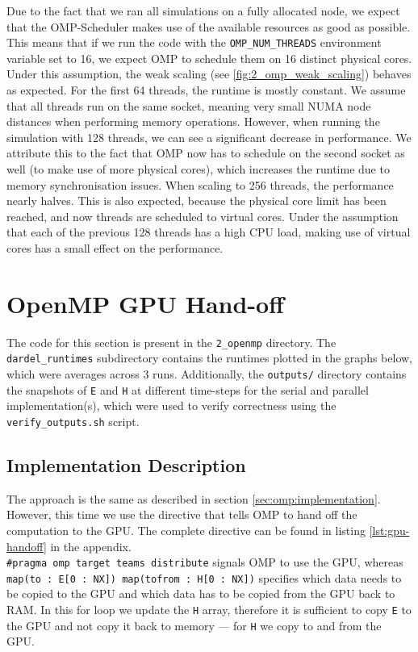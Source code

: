 \documentclass[a4paper,10pt]{article}
\begin{document}
\begin{multicols}{2}
Due to the fact that we ran all simulations on a fully allocated node, we expect that the OMP-Scheduler makes use of the available resources as good as possible.
This means that if we run the code with the \verb|OMP_NUM_THREADS| environment variable set to 16, we expect OMP to schedule them on 16 distinct physical cores.
Under this assumption, the weak scaling (see \ref{fig:2_omp_weak_scaling}) behaves as expected.
For the first 64 threads, the runtime is mostly constant.
We assume that all threads run on the same socket, meaning very small NUMA node distances when performing memory operations.
However, when running the simulation with 128 threads, we can see a significant decrease in performance.
We attribute this to the fact that OMP now has to schedule on the second socket as well (to make use of more physical cores), which increases the runtime due to memory synchronisation issues.
When scaling to 256 threads, the performance nearly halves.
This is also expected, because the physical core limit has been reached, and now threads are scheduled to virtual cores.
Under the assumption that each of the previous 128 threads has a high CPU load, making use of virtual cores has a small effect on the performance.

\section{OpenMP GPU Hand-off}
\label{sec:gpu}
The code for this section is present in the \verb|2_openmp| directory.
The \verb|dardel_runtimes| subdirectory contains the runtimes plotted in the graphs below, which were averages across 3 runs.
Additionally, the \verb|outputs/| directory contains the snapshots of \verb|E| and \verb|H| at different time-steps for the serial and parallel implementation(s), which were used to verify correctness using the \verb|verify_outputs.sh| script.

\subsection{Implementation Description}
\label{sec:gpu:implementation}
The approach is the same as described in section \ref{sec:omp:implementation}.
However, this time we use the directive that tells OMP to hand off the computation to the GPU.
The complete directive can be found in listing \ref{lst:gpu-handoff} in the appendix.\\
\verb|#pragma omp target teams distribute| signals OMP to use the GPU, whereas \\
\verb|map(to : E[0 : NX]) map(tofrom : H[0 : NX])| specifies which data needs to be copied to the GPU and which data has to be copied from the GPU back to RAM. In this for loop we update the \verb|H| array, therefore it is sufficient to copy \verb|E| to the GPU and not copy it back to memory --- for \verb|H| we copy to and from the GPU.


\end{multicols}
\end{document}
